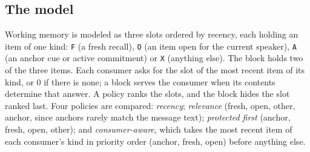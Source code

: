 \documentclass[11pt]{article}
\newcommand{\code}[1]{\texttt{#1}}
\theoremstyle{definition}
\theoremstyle{plain}
\begin{document}
\subsection{The model}

Working memory is modeled as three slots ordered by recency, each holding an item of one kind:
\code{F} (a fresh recall), \code{O} (an item open for the current speaker), \code{A} (an anchor cue
or active commitment) or \code{X} (anything else). The block holds two of the three items. Each
consumer asks for the slot of the most recent item of its kind, or $0$ if there is none; a block
serves the consumer when its contents determine that answer. A policy ranks the slots, and the
block hides the slot ranked last. Four policies are compared: \emph{recency}; \emph{relevance}
(fresh, open, other, anchor, since anchors rarely match the message text); \emph{protected first}
(anchor, fresh, open, other); and \emph{consumer-aware}, which takes the most recent item of each
consumer's kind in priority order (anchor, fresh, open) before anything else.
\end{document}

